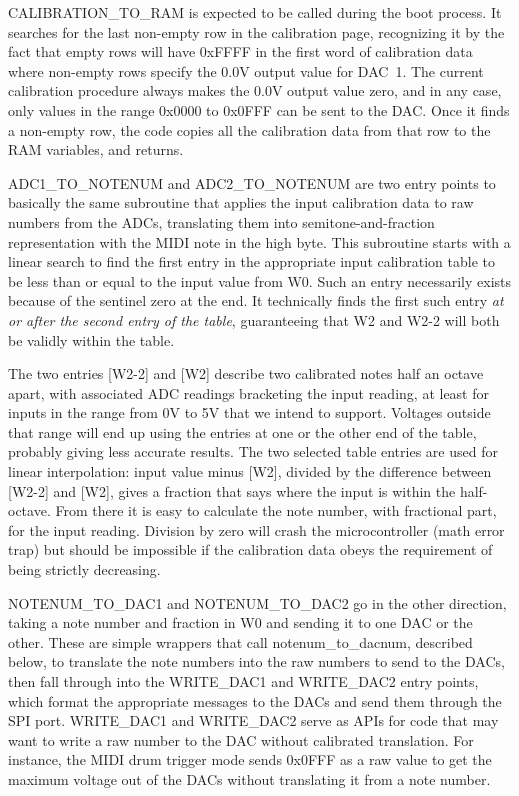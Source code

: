 CALIBRATION\_TO\_RAM is expected to be called during the boot process.  It
searches for the last non-empty row in the calibration page, recognizing it
by the fact that empty rows will have 0xFFFF in the first word of
calibration data where non-empty rows specify the 0.0V output value for
DAC~1.  The current calibration procedure always makes the 0.0V output value
zero, and in any case, only values in the range 0x0000 to 0x0FFF can be sent
to the DAC.  Once it finds a non-empty row, the code copies all the
calibration data from that row to the RAM variables, and returns.

ADC1\_TO\_NOTENUM and ADC2\_TO\_NOTENUM are two entry points to basically the
same subroutine that applies the input calibration data to
raw numbers from the ADCs, translating them into semitone-and-fraction
representation with the MIDI note in the high byte.  This subroutine starts
with a linear search to find the first entry in the appropriate input
calibration table to be less than or equal to the input value from W0.  Such
an entry necessarily exists because of the sentinel zero at the end.  It
technically finds the first such entry \emph{at or after the second entry of
the table}, guaranteeing that W2 and W2-2 will both be validly within the
table.

The two entries [W2-2] and [W2] describe two calibrated notes half an octave
apart, with associated ADC readings bracketing the input reading, at least
for inputs in the range from 0V to 5V that we intend to support.  Voltages
outside that range will end up using the entries at one or the other end of
the table, probably giving less accurate results.  The two selected table
entries are used for linear interpolation: input value minus [W2], divided
by the difference between [W2-2] and [W2], gives a fraction that says where
the input is within the half-octave.  From there it is easy to calculate the
note number, with fractional part, for the input reading.  Division by zero
will crash the microcontroller (math error trap) but should be impossible if
the calibration data obeys the requirement of being strictly decreasing.

NOTENUM\_TO\_DAC1 and NOTENUM\_TO\_DAC2 go in the other direction, taking a
note number and fraction in W0 and sending it to one DAC or the other. 
These are simple wrappers that call notenum\_to\_dacnum, described below, to
translate the note numbers into the raw numbers to send to the DACs, then
fall through into the WRITE\_DAC1 and WRITE\_DAC2 entry points, which format
the appropriate messages to the DACs and send them through the SPI port. 
WRITE\_DAC1 and WRITE\_DAC2 serve as APIs for code that may want to write a
raw number to the DAC without calibrated translation.  For instance, the
MIDI drum trigger mode sends 0x0FFF as a raw value to get the maximum
voltage out of the DACs without translating it from a note number.

